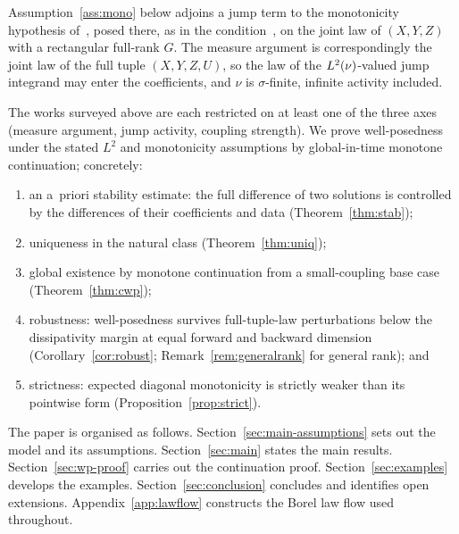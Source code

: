 Assumption~\ref{ass:mono} below adjoins a jump term to the monotonicity hypothesis
of~\cite[(H.1)(1)]{RSZ}, posed there, as in the condition~\cite[(A1)]{BYZ}, on the joint
law of $(X,Y,Z)$ with a rectangular full-rank $G$. The measure argument is correspondingly the joint law of the full tuple
$(X,Y,Z,U)$, so the law of the $L^2(\nu)$-valued jump integrand may enter the coefficients, and
$\nu$ is $\sigma$-finite, infinite activity included.

The works surveyed above are each restricted
on at least one of the three axes (measure argument, jump activity, coupling strength). We
prove well-posedness under the stated $L^2$ and monotonicity assumptions by global-in-time
monotone continuation; concretely:
\begin{enumerate}[label=(\roman*)]
\item an a~priori stability estimate: the full difference of two solutions is
  controlled by the differences of their coefficients and data (Theorem~\ref{thm:stab});
\item uniqueness in the natural class (Theorem~\ref{thm:uniq});
\item global existence by monotone continuation from a small-coupling base case
  (Theorem~\ref{thm:cwp});
\item robustness: well-posedness survives full-tuple-law perturbations below the
  dissipativity margin at equal forward and backward dimension
  (Corollary~\ref{cor:robust}; Remark~\ref{rem:generalrank} for general rank); and
\item strictness: expected diagonal monotonicity is strictly weaker than its pointwise
  form (Proposition~\ref{prop:strict}).
\end{enumerate}

The paper is organised as follows. Section~\ref{sec:main-assumptions} sets out the model
and its assumptions. Section~\ref{sec:main} states the main results.
Section~\ref{sec:wp-proof} carries out the continuation proof.
Section~\ref{sec:examples} develops the examples. Section~\ref{sec:conclusion} concludes
and identifies open extensions.
Appendix~\ref{app:lawflow} constructs the Borel law flow used throughout.

